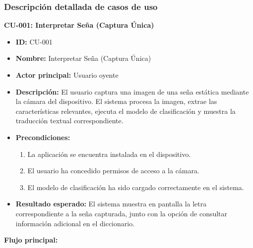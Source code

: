 	
	\subsubsection{Descripción detallada de casos de uso}
	
	\textbf{CU-001: Interpretar Seña (Captura Única)}
	
	\begin{itemize}
		
		\item \textbf{ID:} CU-001
		
		\item \textbf{Nombre:} Interpretar Seña (Captura Única)
		
		\item \textbf{Actor principal:} Usuario oyente
		
		\item \textbf{Descripción:} El usuario captura una imagen de una seña estática mediante la cámara del dispositivo. El sistema procesa la imagen, extrae las características relevantes, ejecuta el modelo de clasificación y muestra la traducción textual correspondiente.
		
		\item \textbf{Precondiciones:}
		\begin{enumerate}
			\item La aplicación se encuentra instalada en el dispositivo.
			\item El usuario ha concedido permisos de acceso a la cámara.
			\item El modelo de clasificación ha sido cargado correctamente en el sistema.
		\end{enumerate}
		
		\item \textbf{Resultado esperado:} El sistema muestra en pantalla la letra correspondiente a la seña capturada, junto con la opción de consultar información adicional en el diccionario.
		
	\end{itemize}
	
	
	\textbf{Flujo principal:}
	
